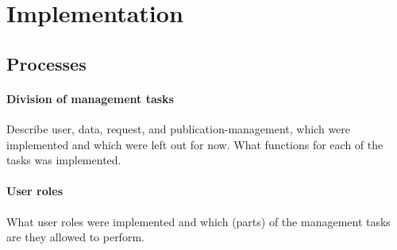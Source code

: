 \section{Implementation}

\subsection{Processes}
\paragraph{Division of management tasks}
Describe user, data, request, and publication-management, which were implemented and which were left out for now.
What functions for each of the tasks was implemented.
\paragraph{User roles}
What user roles were implemented and which (parts) of the management tasks are they allowed to perform.